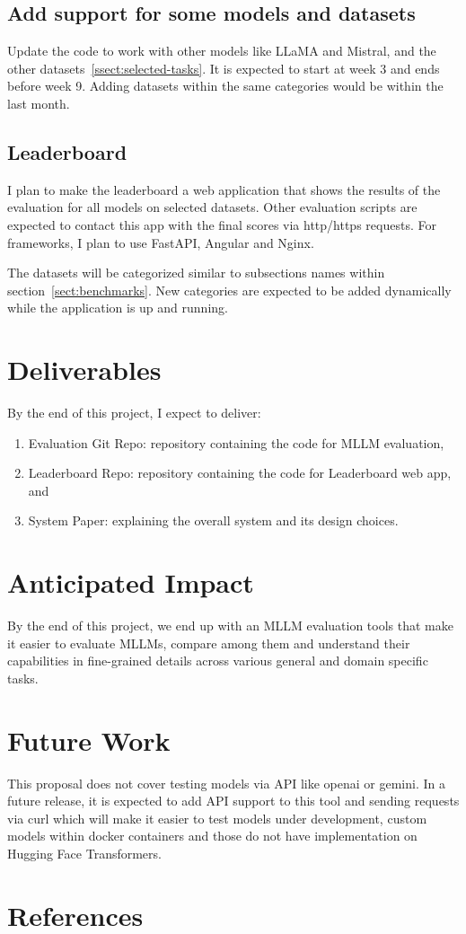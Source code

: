 \documentclass[
	letterpaper, %
]{jdf}
\begin{document}
\subsection{Add support for some models and datasets}
Update the code to work with other models like LLaMA and Mistral, and the other datasets~\ref{ssect:selected-tasks}.
It is expected to start at week 3 and ends before week 9.
Adding datasets within the same categories would be within the last month.
\subsection{Leaderboard}
I plan to make the leaderboard a web application that shows the results of the evaluation for all models on selected datasets.
Other evaluation scripts are expected to contact this app with the final scores via http/https requests.
For frameworks, I plan to use FastAPI, Angular and Nginx.

The datasets will be categorized similar to subsections names within section~\ref{sect:benchmarks}.
New categories are expected to be added dynamically while the application is up and running.

\section{Deliverables}
By the end of this project, I expect to deliver:
\begin{enumerate}
         \item Evaluation Git Repo: repository containing the code for MLLM evaluation,
         \item Leaderboard Repo: repository containing the code for Leaderboard web app, and
         \item System Paper: explaining the overall system and its design choices.
              \end{enumerate}

\section{Anticipated Impact}\label{sect:impact}
By the end of this project, we end up with an MLLM evaluation tools that make it easier to evaluate MLLMs, compare among them and understand their capabilities in fine-grained details across various general and domain specific tasks.

\section{Future Work}
This proposal does not cover testing models via API like openai or gemini.
In a future release, it is expected to add API support to this tool and sending requests via curl which will make it easier to test models under development, custom models within docker containers and those do not have implementation on Hugging Face Transformers.

\section{References}
\printbibliography[heading=none]
\end{document}
